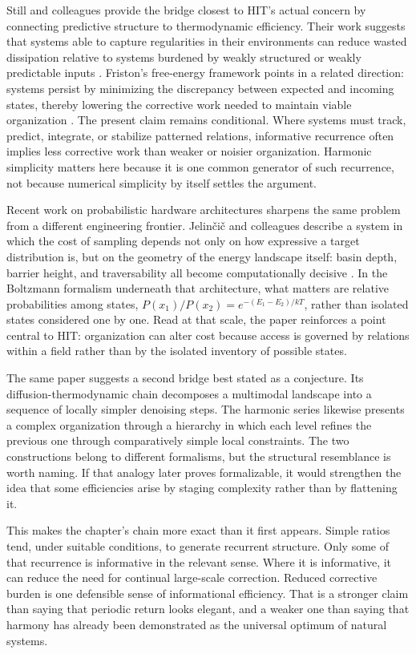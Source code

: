 Still and colleagues provide the bridge closest to HIT's actual concern by connecting predictive structure to thermodynamic efficiency. Their work suggests that systems able to capture regularities in their environments can reduce wasted dissipation relative to systems burdened by weakly structured or weakly predictable inputs \parencite{still_2012}. Friston's free-energy framework points in a related direction: systems persist by minimizing the discrepancy between expected and incoming states, thereby lowering the corrective work needed to maintain viable organization \parencite{friston_2010}. The present claim remains conditional. Where systems must track, predict, integrate, or stabilize patterned relations, informative recurrence often implies less corrective work than weaker or noisier organization. Harmonic simplicity matters here because it is one common generator of such recurrence, not because numerical simplicity by itself settles the argument.

Recent work on probabilistic hardware architectures sharpens the same problem from a different engineering frontier. Jelin{\v{c}}i{\v{c}} and colleagues describe a system in which the cost of sampling depends not only on how expressive a target distribution is, but on the geometry of the energy landscape itself: basin depth, barrier height, and traversability all become computationally decisive \parencite{jelincic_2025}. In the Boltzmann formalism underneath that architecture, what matters are relative probabilities among states, $P(x_1)/P(x_2)=e^{-(E_1-E_2)/kT}$, rather than isolated states considered one by one. Read at that scale, the paper reinforces a point central to HIT: organization can alter cost because access is governed by relations within a field rather than by the isolated inventory of possible states.

The same paper suggests a second bridge best stated as a conjecture. Its diffusion-thermodynamic chain decomposes a multimodal landscape into a sequence of locally simpler denoising steps. The harmonic series likewise presents a complex organization through a hierarchy in which each level refines the previous one through comparatively simple local constraints. The two constructions belong to different formalisms, but the structural resemblance is worth naming. If that analogy later proves formalizable, it would strengthen the idea that some efficiencies arise by staging complexity rather than by flattening it.

This makes the chapter's chain more exact than it first appears. Simple ratios tend, under suitable conditions, to generate recurrent structure. Only some of that recurrence is informative in the relevant sense. Where it is informative, it can reduce the need for continual large-scale correction. Reduced corrective burden is one defensible sense of informational efficiency. That is a stronger claim than saying that periodic return looks elegant, and a weaker one than saying that harmony has already been demonstrated as the universal optimum of natural systems.

